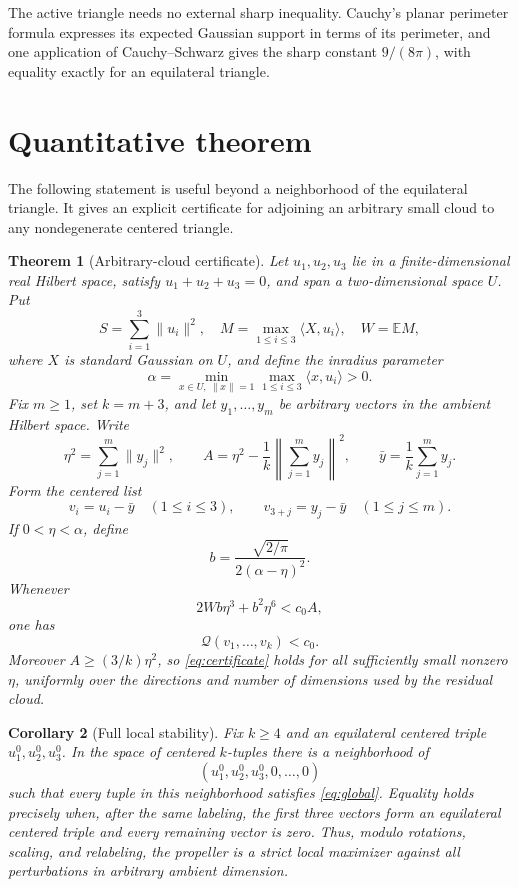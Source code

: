 \documentclass[11pt]{article}
\newtheorem{theorem}{Theorem}
\newtheorem{corollary}[theorem]{Corollary}
\newcommand{\E}{\mathbb E}
\newcommand{\Q}{\mathcal Q}
\begin{document}
The active triangle needs no external sharp inequality. Cauchy's planar
perimeter formula expresses its expected Gaussian support in terms of its
perimeter, and one application of Cauchy--Schwarz gives the sharp constant
$9/(8\pi)$, with equality exactly for an equilateral triangle.

\section*{Quantitative theorem}

The following statement is useful beyond a neighborhood of the equilateral
triangle. It gives an explicit certificate for adjoining an arbitrary small
cloud to any nondegenerate centered triangle.

\begin{theorem}[Arbitrary-cloud certificate]\label{thm:certificate}
Let $u_1,u_2,u_3$ lie in a finite-dimensional real Hilbert space, satisfy
$u_1+u_2+u_3=0$, and span a two-dimensional space $U$. Put
\[
 S=\sum_{i=1}^3\|u_i\|^2,
 \quad
 M=\max_{1\le i\le3}\langle X,u_i\rangle,
 \quad
 W=\E M,
\]
where $X$ is standard Gaussian on $U$, and define the inradius parameter
\[
 \alpha=\min_{x\in U,\ \|x\|=1}\max_{1\le i\le3}\langle x,u_i\rangle>0.
\]
Fix $m\ge1$, set $k=m+3$, and let $y_1,\ldots,y_m$ be arbitrary vectors in
the ambient Hilbert space. Write
\[
 \eta^2=\sum_{j=1}^m\|y_j\|^2,
 \qquad
 A=\eta^2-\frac1k\left\|\sum_{j=1}^m y_j\right\|^2,
 \qquad
 \bar y=\frac1k\sum_{j=1}^m y_j.
\]
Form the centered list
\[
 v_i=u_i-\bar y\quad(1\le i\le3),
 \qquad
 v_{3+j}=y_j-\bar y\quad(1\le j\le m).
\]
If $0<\eta<\alpha$, define
\[
 b=\frac{\sqrt{2/\pi}}{2(\alpha-\eta)^2}.
\]
Whenever
\begin{equation}\label{eq:certificate}
 2Wb\eta^3+b^2\eta^6<c_0A,
\end{equation}
one has
\[
 \Q(v_1,\ldots,v_k)<c_0.
\]
Moreover $A\ge(3/k)\eta^2$, so \eqref{eq:certificate} holds for all
sufficiently small nonzero $\eta$, uniformly over the directions and number
of dimensions used by the residual cloud.
\end{theorem}

\begin{corollary}[Full local stability]\label{cor:local}
Fix $k\ge4$ and an equilateral centered triple
$u_1^0,u_2^0,u_3^0$. In the space of centered $k$-tuples there is a
neighborhood of
\[
 (u_1^0,u_2^0,u_3^0,0,\ldots,0)
\]
such that every tuple in this neighborhood satisfies \eqref{eq:global}.
Equality holds precisely when, after the same labeling, the first three
vectors form an equilateral centered triple and every remaining vector is
zero. Thus, modulo rotations, scaling, and relabeling, the propeller is a
strict local maximizer against all perturbations in arbitrary ambient
dimension.
\end{corollary}
\end{document}
